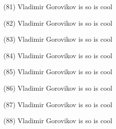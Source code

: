 \documentclass{article}%
\begin{document}
\begin{minipage}{0.3333333333333333\textwidth}%
(81) Vladimir Gorovikov%
\newline%
%
is so%
\newline%
%
is cool%
\newline%
%
\end{minipage}%
\newline%
\begin{minipage}{0.3333333333333333\textwidth}%
(82) Vladimir Gorovikov%
\newline%
%
is so%
\newline%
%
is cool%
\newline%
%
\end{minipage}%
\begin{minipage}{0.3333333333333333\textwidth}%
(83) Vladimir Gorovikov%
\newline%
%
is so%
\newline%
%
is cool%
\newline%
%
\end{minipage}%
\begin{minipage}{0.3333333333333333\textwidth}%
(84) Vladimir Gorovikov%
\newline%
%
is so%
\newline%
%
is cool%
\newline%
%
\end{minipage}%
\newline%
\begin{minipage}{0.3333333333333333\textwidth}%
(85) Vladimir Gorovikov%
\newline%
%
is so%
\newline%
%
is cool%
\newline%
%
\end{minipage}%
\begin{minipage}{0.3333333333333333\textwidth}%
(86) Vladimir Gorovikov%
\newline%
%
is so%
\newline%
%
is cool%
\newline%
%
\end{minipage}%
\begin{minipage}{0.3333333333333333\textwidth}%
(87) Vladimir Gorovikov%
\newline%
%
is so%
\newline%
%
is cool%
\newline%
%
\end{minipage}%
\newline%
\begin{minipage}{0.3333333333333333\textwidth}%
(88) Vladimir Gorovikov%
\newline%
%
is so%
\newline%
%
is cool%
\newline%
%
\end{minipage}%
\end{document}
